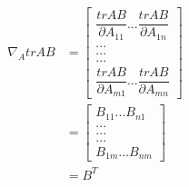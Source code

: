 \begin{equation}
\begin{split}
  \nabla_A trAB &=
  \begin{bmatrix}
    \dfrac{trAB}{\partial A_{11}} ... \dfrac{trAB}{\partial A_{1n}}\\
    . .   .\\
    .  .  .\\
    .   . .\\
    \dfrac{trAB}{\partial A_{m1}} ... \dfrac{trAB}{\partial A_{mn}}
  \end{bmatrix} \\
  &=
  \begin{bmatrix}
    B_{11} ... B_{n1}\\
    . .   .\\
    .  .  .\\
    .   . .\\
    B_{1m} ... B_{nm}
  \end{bmatrix} \\
  &= B^T
\end{split}
\end{equation}

